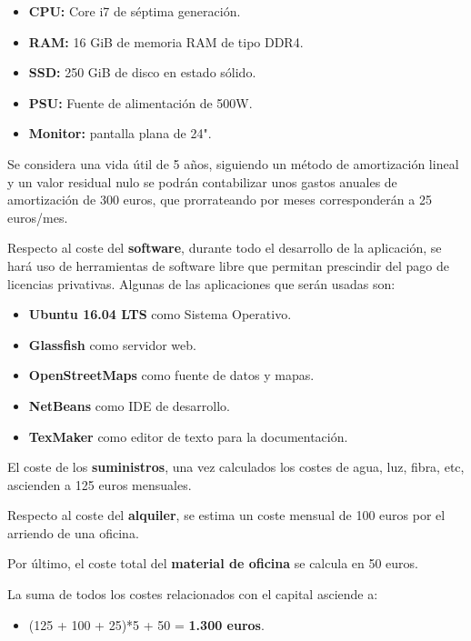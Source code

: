\begin{itemize}
	\item \textbf{CPU:} Core i7 de séptima generación.
	\item \textbf{RAM:} 16 GiB de memoria RAM de tipo DDR4.
	\item \textbf{SSD:} 250 GiB de disco en estado sólido.
	\item \textbf{PSU:} Fuente de alimentación de 500W.
	\item \textbf{Monitor:} pantalla plana de 24".
\end{itemize}

Se considera una vida útil de 5 años, siguiendo un método de amortización lineal y un valor residual nulo se podrán contabilizar unos gastos anuales de amortización de 300 euros, que prorrateando por meses corresponderán a 25 euros/mes.

Respecto al coste del \textbf{software}, durante todo el desarrollo de la aplicación, se hará uso de herramientas de software libre que permitan prescindir del pago de licencias privativas. Algunas de las aplicaciones que serán usadas son:

\begin{itemize}
	\item \textbf{Ubuntu 16.04 LTS} como Sistema Operativo.
	\item \textbf{Glassfish} como servidor web.
	\item \textbf{OpenStreetMaps} como fuente de datos y mapas.
	\item \textbf{NetBeans} como IDE de desarrollo.
	\item \textbf{TexMaker} como editor de texto para la documentación.
\end{itemize}

El coste de los \textbf{suministros}, una vez calculados los costes de agua, luz, fibra, etc, ascienden a 125 euros mensuales.

Respecto al coste del \textbf{alquiler}, se estima un coste mensual de 100 euros por el arriendo de una oficina.

Por último, el coste total del \textbf{material de oficina} se calcula en 50 euros.

La suma de todos los costes relacionados con el capital asciende a:

\begin{itemize}
	\item (125 + 100 + 25)*5 + 50 = \textbf{1.300 euros}.
\end{itemize}

